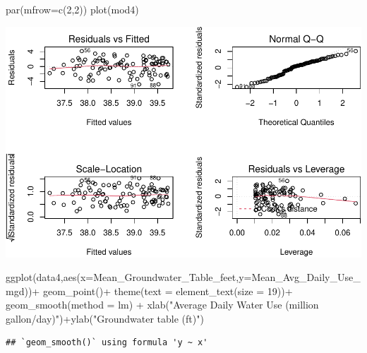 \documentclass[
  12pt,
]{article}
\newenvironment{Shaded}{\begin{snugshade}}{\end{snugshade}}
\newcommand{\AttributeTok}[1]{\textcolor[rgb]{0.77,0.63,0.00}{#1}}
\newcommand{\DecValTok}[1]{\textcolor[rgb]{0.00,0.00,0.81}{#1}}
\newcommand{\FunctionTok}[1]{\textcolor[rgb]{0.00,0.00,0.00}{#1}}
\newcommand{\NormalTok}[1]{#1}
\newcommand{\SpecialCharTok}[1]{\textcolor[rgb]{0.00,0.00,0.00}{#1}}
\newcommand{\StringTok}[1]{\textcolor[rgb]{0.31,0.60,0.02}{#1}}
\begin{document}
\begin{Shaded}
\begin{Highlighting}[]
\FunctionTok{par}\NormalTok{(}\AttributeTok{mfrow=}\FunctionTok{c}\NormalTok{(}\DecValTok{2}\NormalTok{,}\DecValTok{2}\NormalTok{))}
\FunctionTok{plot}\NormalTok{(mod4)}
\end{Highlighting}
\end{Shaded}

\includegraphics{Project_files/figure-latex/groundwater and withdraws-1.pdf}

\begin{Shaded}
\begin{Highlighting}[]
\FunctionTok{ggplot}\NormalTok{(data4,}\FunctionTok{aes}\NormalTok{(}\AttributeTok{x=}\NormalTok{Mean\_Groundwater\_Table\_feet,}\AttributeTok{y=}\NormalTok{Mean\_Avg\_Daily\_Use\_mgd))}\SpecialCharTok{+}
       \FunctionTok{geom\_point}\NormalTok{()}\SpecialCharTok{+}
  \FunctionTok{theme}\NormalTok{(}\AttributeTok{text =} \FunctionTok{element\_text}\NormalTok{(}\AttributeTok{size =} \DecValTok{19}\NormalTok{))}\SpecialCharTok{+}
  \FunctionTok{geom\_smooth}\NormalTok{(}\AttributeTok{method =}\NormalTok{ lm) }\SpecialCharTok{+}
  \FunctionTok{xlab}\NormalTok{(}\StringTok{"Average Daily Water Use (million gallon/day)"}\NormalTok{)}\SpecialCharTok{+}\FunctionTok{ylab}\NormalTok{(}\StringTok{"Groundwater table (ft)"}\NormalTok{)}
\end{Highlighting}
\end{Shaded}

\begin{verbatim}
## `geom_smooth()` using formula 'y ~ x'
\end{verbatim}
\end{document}
